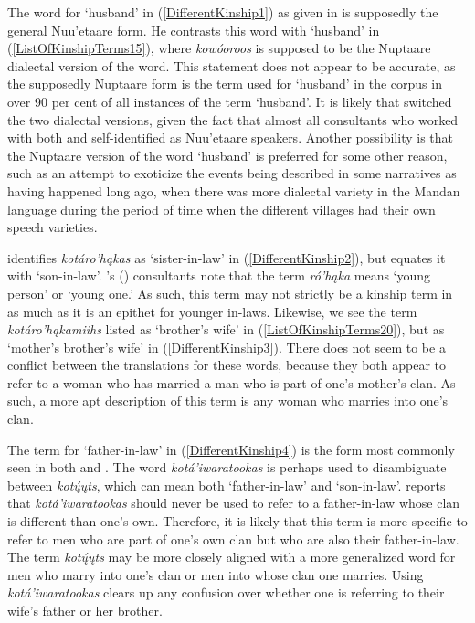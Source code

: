 The word for `husband' in (\ref{DifferentKinship1}) as given in \citet[306]{hollow1970} is supposedly the general Nuu'etaare form. He contrasts this word with `husband' in (\ref{ListOfKinshipTerms15}), where \textit{kowóoroos} is supposed to be the Nuptaare dialectal version of the word. This statement does not appear to be accurate, as the supposedly Nuptaare form is the term used for `husband' in the corpus in over 90 per cent of all instances of the term `husband'. It is likely that \citet{hollow1970} switched the two dialectal versions, given the fact that almost all consultants who worked with both \citet{bowers1950} and \citet{hollow1970} self-identified as Nuu'etaare speakers. Another possibility is that the Nuptaare version of the word `husband' is preferred for some other reason, such as an attempt to exoticize the events being described in some narratives as having happened long ago, when there was more dialectal variety in the Mandan language during the period of time when the different villages had their own speech varieties.

\citet[244]{hollow1970} identifies \textit{kotáro'hąkas} as `sister-in-law' in (\ref{DifferentKinship2}), but \citet[40]{bowers1950} equates it with `son-in-law'. \citeauthor{bowers1950}'s (\citeyear{bowers1950}) consultants note that the term \textit{ró'hąka} means `young person' or `young one.' As such, this term may not strictly be a kinship term in as much as it is an epithet for younger in-laws. Likewise, we see the term \textit{kotáro'hąkamiihs} listed as `brother's wife' in (\ref{ListOfKinshipTerms20}), but as `mother's brother's wife' in (\ref{DifferentKinship3}). There does not seem to be a conflict between the translations for these words, because they both appear to refer to a woman who has married a man who is part of one's mother's clan. As such, a more apt description of this term is any woman who marries into one's clan.

The term for `father-in-law' in (\ref{DifferentKinship4}) is the form most commonly seen in both \citet{hollow1970,hollow1973a} and \citet{trechter2012}. The word \textit{kotá'iwaratookas} is perhaps used to disambiguate between \textit{kotų́ųts}, which can mean both `father-in-law' and `son-in-law'. \citet[55]{bowers1950} reports that \textit{kotá'iwaratookas} should never be used to refer to a father-in-law whose clan is different than one's own. Therefore, it is likely that this term is more specific to refer to men who are part of one's own clan but who are also their father-in-law. The term \textit{kotų́ųts} may be more closely aligned with a more generalized word for men who marry into one's clan or men into whose clan one marries. Using \textit{kotá'iwaratookas} clears up any confusion over whether one is referring to their wife's father or her brother.
 
